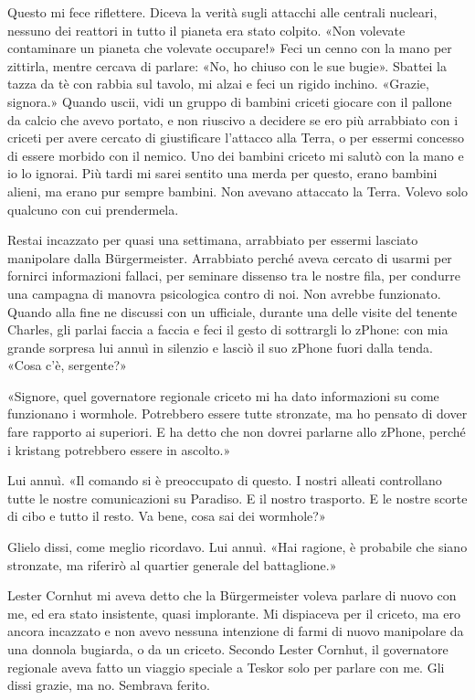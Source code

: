 Questo mi fece riflettere. Diceva la verità sugli attacchi alle centrali
nucleari, nessuno dei reattori in tutto il pianeta era stato colpito.
«Non volevate contaminare un pianeta che volevate occupare!» Feci un
cenno con la mano per zittirla, mentre cercava di parlare: «No, ho
chiuso con le sue bugie». Sbattei la tazza da tè con rabbia sul tavolo,
mi alzai e feci un rigido inchino. «Grazie, signora.» Quando uscii, vidi
un gruppo di bambini criceti giocare con il pallone da calcio che avevo
portato, e non riuscivo a decidere se ero più arrabbiato con i criceti
per avere cercato di giustificare l'attacco alla Terra, o per essermi
concesso di essere morbido con il nemico. Uno dei bambini criceto mi
salutò con la mano e io lo ignorai. Più tardi mi sarei sentito una merda
per questo, erano bambini alieni, ma erano pur sempre bambini. Non
avevano attaccato la Terra. Volevo solo qualcuno con cui prendermela.

\hfill\break

Restai incazzato per quasi una settimana, arrabbiato per essermi
lasciato manipolare dalla Bürgermeister. Arrabbiato perché aveva cercato
di usarmi per fornirci informazioni fallaci, per seminare dissenso tra
le nostre fila, per condurre una campagna di manovra psicologica contro
di noi. Non avrebbe funzionato. Quando alla fine ne discussi con un
ufficiale, durante una delle visite del tenente Charles, gli parlai
faccia a faccia e feci il gesto di sottrargli lo zPhone: con mia grande
sorpresa lui annuì in silenzio e lasciò il suo zPhone fuori dalla tenda.
«Cosa c'è, sergente?»

«Signore, quel governatore regionale criceto mi ha dato informazioni su
come funzionano i wormhole. Potrebbero essere tutte stronzate, ma ho
pensato di dover fare rapporto ai superiori. E ha detto che non dovrei
parlarne allo zPhone, perché i kristang potrebbero essere in ascolto.»

Lui annuì. «Il comando si è preoccupato di questo. I nostri alleati
controllano tutte le nostre comunicazioni su Paradiso. E il nostro
trasporto. E le nostre scorte di cibo e tutto il resto. Va bene, cosa
sai dei wormhole?»

Glielo dissi, come meglio ricordavo. Lui annuì. «Hai ragione, è
probabile che siano stronzate, ma riferirò al quartier generale del
battaglione.»

\hfill\break

Lester Cornhut mi aveva detto che la Bürgermeister voleva parlare di
nuovo con me, ed era stato insistente, quasi implorante. Mi dispiaceva
per il criceto, ma ero ancora incazzato e non avevo nessuna intenzione
di farmi di nuovo manipolare da una donnola bugiarda, o da un criceto.
Secondo Lester Cornhut, il governatore regionale aveva fatto un viaggio
speciale a Teskor solo per parlare con me. Gli dissi grazie, ma no.
Sembrava ferito.

